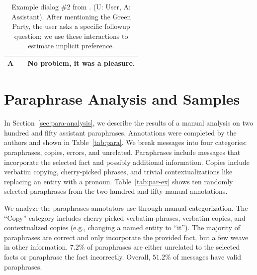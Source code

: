 \begin{table}[t]
\begin{center}
\begin{tabular}{p{0.2cm}p{3.8cm}p{11cm}}
            A & \texttt{}                                    & No problem, it was a pleasure.                                                                                                                                                                       \\
            \bottomrule[\heavyrulewidth]
        \end{tabular}
    \end{center}
    \caption{
        Example dialog \#2 from \rover{}. (U: User, A: Assistant).
        After mentioning the Green Party, the user asks a specific followup question; we use these interactions to estimate implicit preference.
    }
    \label{tab:dialog_example2}
\end{table}

\section{Paraphrase Analysis and Samples}
\label{apx:para}
In Section~\ref{sec:para-analysis}, we describe the results of a manual analysis on two hundred and fifty assistant paraphrases.
Annotations were completed by the authors and shown in Table~\ref{tab:para}.
We break messages into four categories: paraphrases, copies, errors, and unrelated.
Paraphrases include messages that incorporate the selected fact and possibly additional information.
Copies include verbatim copying, cherry-picked phrases, and trivial contextualizations like replacing an entity with a pronoun.
Table~\ref{tab:par-ex} shows ten randomly selected paraphrases from the two hundred and fifty manual annotations.

\begin{table}
    \small
    \centering
    \caption{
        We analyze the paraphrases annotators use through manual categorization.
        The ``Copy'' category includes cherry-picked verbatim phrases, verbatim copies, and contextualized copies (e.g., changing a named entity to ``it'').
        The majority of paraphrases are correct and only incorporate the provided fact, but a few weave in other information.
        $7.2\%$ of paraphrases are either unrelated to the selected facts or paraphrase the fact incorrectly.
        Overall, $51.2\%$ of messages have valid paraphrases.
    }
    \label{tab:para}
\end{table}


